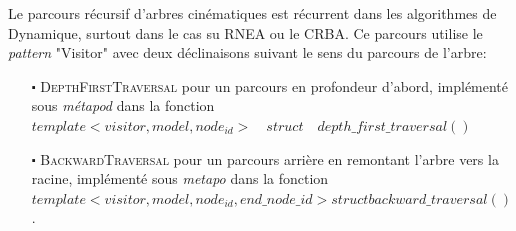 \documentclass{report}
\begin{document}
Le parcours récursif d'arbres cinématiques est récurrent dans les algorithmes de Dynamique, surtout dans le cas su RNEA ou le CRBA. Ce parcours utilise le \emph{pattern} "Visitor" avec deux déclinaisons suivant le sens du parcours de l'arbre:

\begin{itemize}
\item[$\centerdot$] \textsc{DepthFirstTraversal} pour un parcours en profondeur d'abord, implémenté sous \emph{métapod} dans la fonction $\mathit{template<visitor, model, node_{id}> \quad struct \quad depth\_first\_traversal()}$
\item[$\centerdot$] \textsc{BackwardTraversal} pour un parcours arrière en remontant l'arbre vers la racine, implémenté sous \emph{metapo} dans la fonction $\mathit{template<visitor, model, node_{id}, end\_node\_{id}> struct backward\_traversal()}$.
\end{itemize}
\bigskip
\end{document}
